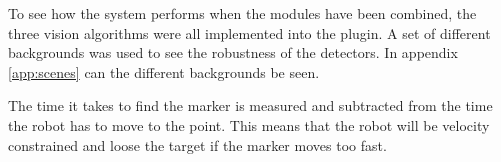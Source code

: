 To see how the system performs when the modules have been combined, the three vision algorithms were all implemented into the plugin.
A set of different backgrounds was used to see the robustness of the detectors.
In appendix \ref{app:scenes} can the different backgrounds be seen.

The time it takes to find the marker is measured and subtracted from the time the robot has to move to the point.
This means that the robot will be velocity constrained and loose the target if the marker moves too fast.